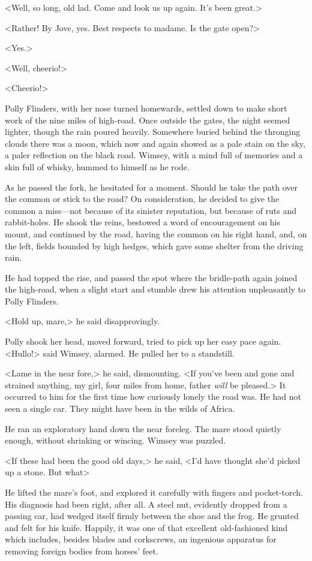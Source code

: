 <Well, so long, old lad. Come and look us up again. It's been great.>

<Rather! By Jove, yes. Best respects to madame. Is the gate open?>

<Yes.>

<Well, cheerio!>

<Cheerio!>

Polly Flinders, with her nose turned homewards, settled down to make short work of the nine miles of high-road. Once outside the gates, the night seemed lighter, though the rain poured heavily. Somewhere buried behind the thronging clouds there was a moon, which now and again showed as a pale stain on the sky, a paler reflection on the black road. Wimsey, with a mind full of memories and a skin full of whisky, hummed to himself as he rode.

As he passed the fork, he hesitated for a moment. Should he take the path over the common or stick to the road? On consideration, he decided to give the common a miss—not because of its sinister reputation, but because of ruts and rabbit-holes. He shook the reins, bestowed a word of encouragement on his mount, and continued by the road, having the common on his right hand, and, on the left, fields bounded by high hedges, which gave some shelter from the driving rain.

He had topped the rise, and passed the spot where the bridle-path again joined the high-road, when a slight start and stumble drew his attention unpleasantly to Polly Flinders.

<Hold up, mare,> he said disapprovingly.

Polly shook her head, moved forward, tried to pick up her easy pace again. <Hullo!> said Wimsey, alarmed. He pulled her to a standstill.

<Lame in the near fore,> he said, dismounting. <If you've been and gone and strained anything, my girl, four miles from home, father \textit{will} be pleased.> It occurred to him for the first time how curiously lonely the road was. He had not seen a single car. They might have been in the wilds of Africa.

He ran an exploratory hand down the near foreleg. The mare stood quietly enough, without shrinking or wincing. Wimsey was puzzled.

<If these had been the good old days,> he said, <I'd have thought she'd picked up a stone. But what\longdash>

He lifted the mare's foot, and explored it carefully with fingers and pocket-torch. His diagnosis had been right, after all. A steel nut, evidently dropped from a passing car, had wedged itself firmly between the shoe and the frog. He grunted and felt for his knife. Happily, it was one of that excellent old-fashioned kind which includes, besides blades and corkscrews, an ingenious apparatus for removing foreign bodies from horses' feet.

